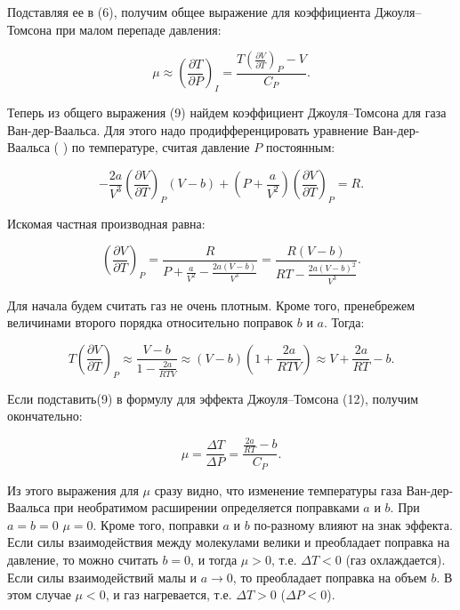 Подставляя ее в (6), получим общее выражение для коэффициента Джоуля–Томсона при малом перепаде давления:

\begin{equation}
\mu \approx \left( \frac{\partial T}{\partial P} \right)_I = \frac{T \left( \frac{\partial V}{\partial T} \right)_P - V}{C_P}.
\end{equation}

Теперь из общего выражения (9) найдем коэффициент Джоуля–Томсона для газа Ван-дер-Ваальса. Для этого надо продифференцировать уравнение Ван-дер-Ваальса (  ) по температуре, считая давление $P$ постоянным:

\begin{equation}
-\frac{2a}{V^3} \left( \frac{\partial V}{\partial T} \right)_P (V - b) + \left( P + \frac{a}{V^2} \right) \left( \frac{\partial V}{\partial T} \right)_P = R.
\end{equation}

Искомая частная производная равна:

\begin{equation}
\left( \frac{\partial V}{\partial T} \right)_P = \frac{R}{P + \frac{a}{V^2} - \frac{2a(V - b)}{V^3}} = \frac{R(V - b)}{RT - \frac{2a(V - b)^2}{V^3}}.
\end{equation}

Для начала будем считать газ не очень плотным. Кроме того, пренебрежем величинами второго порядка относительно поправок $b$ и $a$. Тогда:

\begin{equation}
T \left( \frac{\partial V}{\partial T} \right)_P \approx \frac{V - b}{1 - \frac{2a}{RTV}} \approx (V - b) \left( 1 + \frac{2a}{RTV} \right) \approx V + \frac{2a}{RT} - b.
\end{equation}

Если подставить(9) в формулу для эффекта Джоуля–Томсона (12), получим окончательно:

\begin{equation}
\mu = \frac{\Delta T}{\Delta P} = \frac{\frac{2a}{RT} - b}{C_P}.
\end{equation}

Из этого выражения для $\mu$ сразу видно, что изменение температуры газа Ван-дер-Ваальса при необратимом расширении определяется поправками $a$ и $b$. При $a = b = 0$ $\mu = 0$. Кроме того, поправки $a$ и $b$ по-разному влияют на знак эффекта. Если силы взаимодействия между молекулами велики и преобладает поправка на давление, то можно считать $b = 0$, и тогда $\mu > 0$, т.е. $\Delta T < 0$ (газ охлаждается). Если силы взаимодействий малы и $a \to 0$, то преобладает поправка на объем $b$. В этом случае $\mu < 0$, и газ нагревается, т.е. $\Delta T > 0$ ($\Delta P < 0$).


